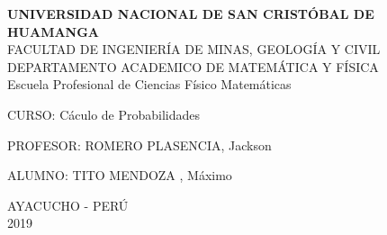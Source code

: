\documentclass[a4paper, 12pt]{article}
\begin{document}
\thispagestyle{empty}
\begin{center}
\textbf{UNIVERSIDAD NACIONAL DE SAN CRIST\'OBAL DE HUAMANGA}\\
\vskip 0.4cm
FACULTAD DE INGENIER\'IA DE MINAS, GEOLOG\'IA Y CIVIL\\
DEPARTAMENTO ACADEMICO DE MATEM\'ATICA Y F\'ISICA\\
\vskip 0.45cm
Escuela Profesional de Ciencias F\'isico Matem\'aticas\\
\end{center}
\vskip 1cm


\vskip 0.5cm

\begin{center}

\vskip 2cm 

CURSO: C\'aculo de Probabilidades

\vskip 1cm 

PROFESOR: ROMERO PLASENCIA, Jackson 

\vskip 1cm 

ALUMNO: TITO MENDOZA , M\'aximo

\vfill

AYACUCHO - PER\'U\\
2019 
\end{center}
\end{document}
